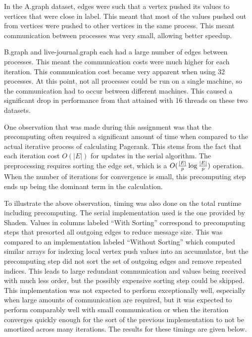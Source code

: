 \documentclass[a4paper]{article}
\begin{document}
In the A.graph dataset, edges were such that a vertex pushed its values to vertices that were close in label. This meant that most of the values
pushed out from vertices were pushed to other vertices in the same process. This meant communication between processes was very small, allowing better
speedup.

B.graph and live-journal.graph each had a large number of edges between processes. This meant the communication costs were much higher for each
iteration. This communication cost became very apparent when using 32 processes. At this point, not all processes could be run on a single machine, so
the communication had to occur between different machines. This caused a significant drop in performance from that attained with 16 threads on these
two datasets.

One observation that was made during this assignment was that the precomputing often required a significant amount of time when compared to the actual
iterative process of calculating Pagerank. This stems from the fact that each iteration cost $O(|E|)$ for updates in the serial algorithm. The
preprocessing requires sorting the edge set, which is a $O({{|E|}\over{p}} \log {{|E|}\over{p}})$ operation. When the number of iterations for convergence
is small, this precomputing step ends up being the dominant term in the calculation.

To illustrate the above observation, timing was also done on the total runtime including precomputing. The serial implementation used is the one provided by Shaden. Values in columns
labeled ``With Sorting'' correspond to precomputing steps that presorted all outgoing edges to reduce message size. This was compared to an
implementation labeled ``Without Sorting'' which computed similar arrays for indexing local vertex push values into an accumulator, but the
precomputing step did not sort the set of outgoing edges and remove repeated indices. This leads to large redundant communication and values being
received with much less order, but the possibly expensive sorting step could be skipped. This implementation was not expected to perform exceptionally
well, especially when large amounts of communication are required, but it was expected to perform comparably well with small communication or when the
iteration converges quickly enough for the sort of the previous implementation to not be amortized across many iterations. The results for these
timings are given below.
\end{document}
